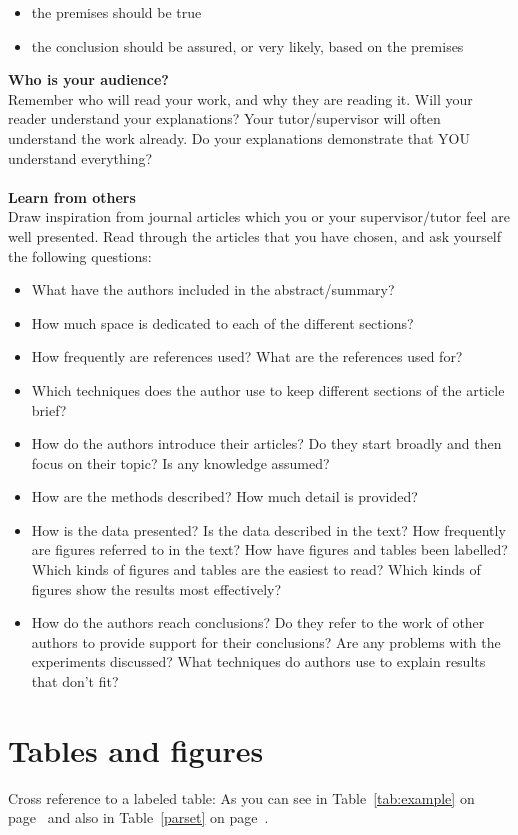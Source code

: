 \documentclass[aodsor,preprint]{imsart}
\numberwithin{equation}{section}
\theoremstyle{plain}
\begin{document}
\begin{itemize}
  \item the premises should be true
  \item the conclusion should be assured, or very likely, based on the premises
\end{itemize}


{\bf Who is your audience?}\\
Remember who will read your work, and why they are reading it. Will your reader understand your explanations? Your tutor/supervisor will often understand the work already. Do your explanations demonstrate that YOU understand everything?\\
\\
{\bf Learn from others}\\
Draw inspiration from journal articles which you or your supervisor/tutor feel are well presented. Read through the articles that you have chosen, and ask yourself the following questions:

\begin{itemize}
  \item What have the authors included in the abstract/summary?
  \item How much space is dedicated to each of the different sections?
  \item How frequently are references used? What are the references used for?
  \item Which techniques does the author use to keep different sections of the article brief?
  \item How do the authors introduce their articles? Do they start broadly and then focus on their topic? Is any knowledge assumed?
  \item How are the methods described? How much detail is provided?
  \item How is the data presented? Is the data described in the text? How frequently are figures referred to in the text? How have figures and tables been labelled? Which kinds of figures and tables are the easiest to read? Which kinds of figures show the results most effectively?
  \item How do the authors reach conclusions? Do they refer to the work of other authors to provide support for their conclusions? Are any problems with the experiments discussed? What techniques do authors use to explain results that don’t fit?
\end{itemize}



\section{Tables and figures}
Cross reference to a labeled table: As you can see in Table~\ref{tab:example} on
page~\pageref{tab:example} and also in Table~\ref{parset} on page~\pageref{parset}.
\end{document}
